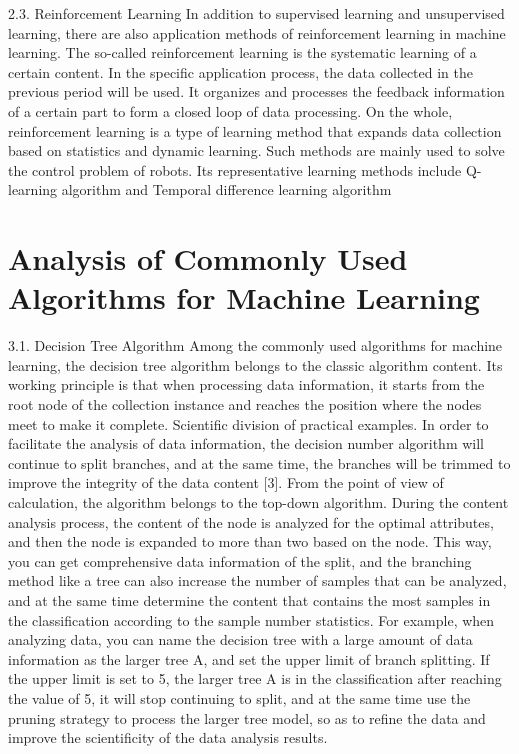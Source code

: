 \documentclass{article}
\begin{document}
2.3. Reinforcement Learning
In addition to supervised learning and unsupervised learning, there are also application methods of 
reinforcement learning in machine learning. The so-called reinforcement learning is the systematic 
learning of a certain content. In the specific application process, the data collected in the previous 
period will be used. It organizes and processes the feedback information of a certain part to form a 
closed loop of data processing. On the whole, reinforcement learning is a type of learning method that 
expands data collection based on statistics and dynamic learning. Such methods are mainly used to 
solve the control problem of robots. Its representative learning methods include Q-learning algorithm 
and Temporal difference learning algorithm
\section{Analysis of Commonly Used Algorithms for Machine Learning}
3.1. Decision Tree Algorithm
Among the commonly used algorithms for machine learning, the decision tree algorithm belongs to 
the classic algorithm content. Its working principle is that when processing data information, it starts 
from the root node of the collection instance and reaches the position where the nodes meet to make it 
complete. Scientific division of practical examples. In order to facilitate the analysis of data 
information, the decision number algorithm will continue to split branches, and at the same time, the 
branches will be trimmed to improve the integrity of the data content [3]. From the point of view of 
calculation, the algorithm belongs to the top-down algorithm. During the content analysis process, the 
content of the node is analyzed for the optimal attributes, and then the node is expanded to more than 
two based on the node. This way, you can get comprehensive data information of the split, and the 
branching method like a tree can also increase the number of samples that can be analyzed, and at the 
same time determine the content that contains the most samples in the classification according to the 
sample number statistics. For example, when analyzing data, you can name the decision tree with a 
large amount of data information as the larger tree A, and set the upper limit of branch splitting. If the 
upper limit is set to 5, the larger tree A is in the classification after reaching the value of 5, it will 
stop continuing to split, and at the same time use the pruning strategy to process the larger tree model, 
so as to refine the data and improve the scientificity of the data analysis results.
\end{document}

